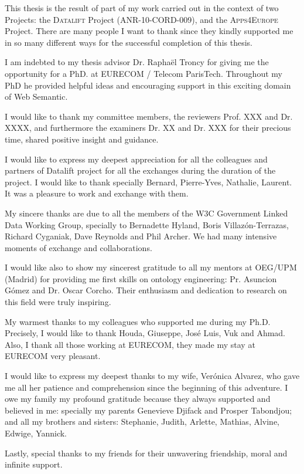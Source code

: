 
This thesis is the result of part of my work carried out in the context of two Projects: the \textsc{Datalift} Project (ANR-10-CORD-009), and the \textsc{Apps4Europe} Project. 
There are many people I want to thank since they kindly supported me in so many different ways for the successful completion of this thesis.


I am indebted to my thesis advisor Dr. Rapha\"{e}l Troncy for giving me the opportunity for a PhD. at EURECOM / Telecom ParisTech. Throughout my PhD  he provided helpful ideas and encouraging support in this exciting domain of Web Semantic. 

I would like to thank my committee members, the reviewers Prof. XXX  and Dr. XXXX, and furthermore the examiners Dr. XX and Dr. XXX for their precious time, shared positive insight and guidance.

I would like to express my deepest appreciation for all the colleagues and partners of Datalift project for all the exchanges during the duration of the project. I would like to thank specially Bernard, Pierre-Yves, Nathalie, Laurent. It was a pleasure to work and exchange with them.

My sincere thanks are due to all the members of the W3C Government Linked Data Working Group, specially to Bernadette Hyland, Boris Villaz\'{o}n-Terrazas, Richard Cyganiak, Dave Reynolds and Phil Archer. We had many intensive moments of exchange and collaborations.

I would like also to show my sincerest gratitude to all my mentors at OEG/UPM (Madrid) for providing me first skills on ontology engineering: Pr. Asuncion G\'{o}mez and Dr. Oscar Corcho. Their enthusiasm and dedication to research on this field were truly inspiring.


My warmest thanks to my colleagues who supported me during my Ph.D. Precisely, I would like to thank Houda, Giuseppe, Jos\'{e} Luis, Vuk and Ahmad. Also, I thank all those working at EURECOM, they made my stay at EURECOM very pleasant.

I would like to express my deepest thanks to my wife, Ver\'{o}nica Alvarez, who gave me all her patience and comprehension since the beginning of this adventure. 
I owe my family my profound gratitude because they
always supported and believed in me: specially my parents Genevieve Djifack and Prosper Tabondjou; and all my brothers and sisters: Stephanie, Judith, Arlette, Mathias, Alvine, Edwige, Yannick.

Lastly, special thanks to my friends for their unwavering friendship, moral and infinite support.


 

